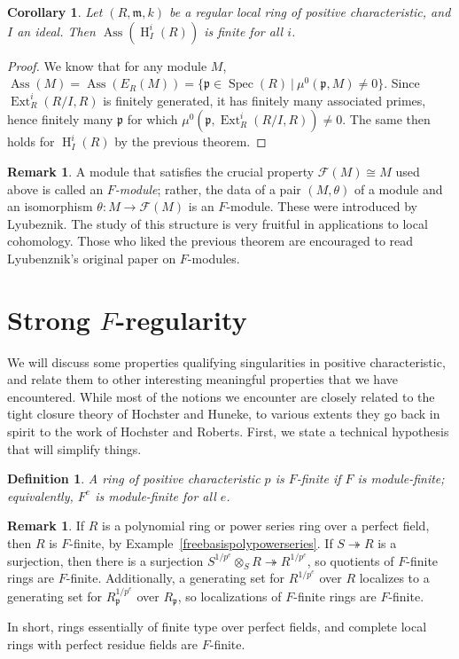 \documentclass[11pt]{book}
\newtheorem{corollary}[theorem]{Corollary}
\newtheorem{definition}[theorem]{Definition}
\numberwithin{equation}{section}
\numberwithin{theorem}{chapter}
\theoremstyle{definition}
\newtheorem*{basic properties}{Basic Properties}
\newtheorem*{Important Remark}{Important Remark}
\newtheorem{remark}[theorem]{Remark}
\theoremstyle{remark}
\newcommand{\m}{\mathfrak{m}}
\newcommand{\p}{\mathfrak{p}}
\newcommand{\cF}{\mathcal{F}}
\newcommand{\Spec}{\operatorname{Spec}}
\newcommand{\Ext}{\operatorname{Ext}}
\newcommand{\Ass}{\operatorname{Ass}}
\renewcommand{\H}{\operatorname{H}}
\begin{document}
\begin{corollary}
	Let $(R,\m,k)$ be a regular local ring of positive characteristic, and $I$ an ideal. Then $\Ass(\H^i_I(R))$ is finite for all $i$.
\end{corollary}
\begin{proof}
	We know that for any module $M$, $\Ass(M)=\Ass(E_R(M))=\{ \p\in\Spec(R) \ | \ \mu^0(\p,M)\neq 0\}$. Since $\Ext^i_R(R/I,R)$ is finitely generated, it has finitely many associated primes, hence finitely many $\p$ for which $\mu^0(\p, \Ext^i_R(R/I,R))\neq 0$. The same then holds for $\H^i_I(R)$ by the previous theorem.
\end{proof}

\begin{remark} A module that satisfies the crucial property $\cF(M)\cong M$ used above is called an \emph{$F$-module}; rather, the data of a pair $(M,\theta)$ of a module and an isomorphism $\theta:M\to \cF(M)$ is an $F$-module. These were introduced by Lyubeznik. The study of this structure is very fruitful in applications to local cohomology. Those who liked the previous theorem are encouraged to read Lyubenznik's original paper on $F$-modules.
	\end{remark}

\section{Strong $F$-regularity}

We will discuss some properties qualifying singularities in positive characteristic, and relate them to other interesting meaningful properties that we have encountered. While most of the notions we encounter are closely related to the tight closure theory of Hochster and Huneke, to various extents they go back in spirit to the work of Hochster and Roberts. First, we state a technical hypothesis that will simplify things.

\begin{definition}
	A ring of positive characteristic $p$ is \emph{$F$-finite} if $F$ is module-finite; equivalently, $F^e$ is module-finite for all $e$.
\end{definition}

\begin{remark} If $R$ is a polynomial ring or power series ring over a perfect field, then $R$ is $F$-finite, by Example~\ref{freebasispolypowerseries}. If $S\twoheadrightarrow R$ is a surjection, then there is a surjection $S^{1/p^e} \otimes_S R \twoheadrightarrow R^{1/p^e}$, so quotients of $F$-finite rings are $F$-finite. Additionally, a generating set for $R^{1/p^e}$ over $R$ localizes to a generating set for $R_\p^{1/p^e}$ over $R_\p$, so localizations of $F$-finite rings are $F$-finite.
	
	In short, rings essentially of finite type over perfect fields, and complete local rings with perfect residue fields are $F$-finite.
\end{remark}
\end{document}
